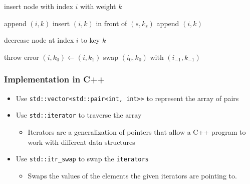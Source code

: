 \documentclass{beamer}
\begin{document}
\begin{frame}
\begin{algorithm}[H]
		\caption{insert node with index $i$ with weight $k$}
		\begin{algorithmic}[1]
			\State append \( (i,k) \)  
			\Else
			\State insert \( (i,k) \) in front of \( (s,k_s) \) 
			\State \Return
			\EndIf
			\EndWhile
			\State append \( (i,k) \) 
			\EndIf
		\EndFunction
		\end{algorithmic}
	\end{algorithm}
\end{frame}

\begin{frame}
	\begin{algorithm}[H]
		\caption{decrease node at index \( i \) to key \( k \)}
		\begin{algorithmic}[1]
			\State throw error
			\Else
			\State \( (i, k_0) \leftarrow (i, k_1) \)  
			\State swap \( (i_0, k_0) \) with \( (i_{-1}, k_{-1}) \) 
			\EndWhile
			\EndIf
			\EndFunction
		\end{algorithmic}
	\end{algorithm}	
\end{frame}

\begin{frame}
	\frametitle{Implementation in C++}
	\begin{itemize}
		\item Use \texttt{std::vector<std::pair<int, int>>} to represent the array of pairs
		\item Use \texttt{std::iterator} to traverse the array 
		\begin{itemize}
			\item Iterators are a generalization of pointers that allow a C++ program to work with different data structures
		\end{itemize}
		\item Use \texttt{std::itr\_swap} to swap the \texttt{iterators} 
		\begin{itemize}
			\item Swaps the values of the elements the given iterators are pointing to.
		\end{itemize}	
	\end{itemize}
\end{frame}
\end{document}
